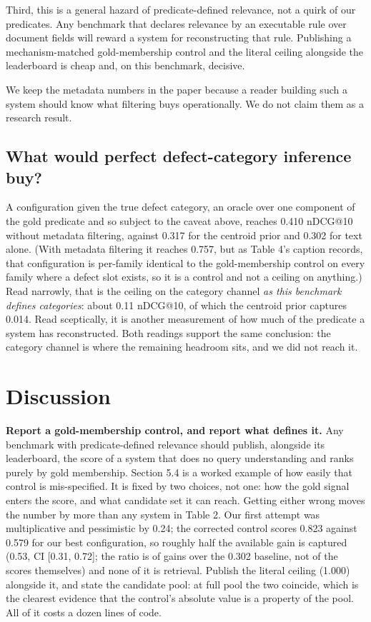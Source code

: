 \documentclass[runningheads]{llncs}
\begin{document}
Third, this is a general hazard of predicate-defined relevance, not a quirk of our predicates. Any benchmark that declares relevance by an executable rule over document fields will reward a system for reconstructing that rule. Publishing a mechanism-matched gold-membership control and the literal ceiling alongside the leaderboard is cheap and, on this benchmark, decisive.

We keep the metadata numbers in the paper because a reader building such a system should know what filtering buys operationally. We do not claim them as a research result.


\subsection{What would perfect defect-category inference buy?}
A configuration given the true defect category, an oracle over one component of the gold predicate and so subject to the caveat above, reaches 0.410 nDCG@10 without metadata filtering, against 0.317 for the centroid prior and 0.302 for text alone. (With metadata filtering it reaches 0.757, but as Table 4's caption records, that configuration is per-family identical to the gold-membership control on every family where a defect slot exists, so it is a control and not a ceiling on anything.) Read narrowly, that is the ceiling on the category channel \textit{as this benchmark defines categories}: about 0.11 nDCG@10, of which the centroid prior captures 0.014. Read sceptically, it is another measurement of how much of the predicate a system has reconstructed. Both readings support the same conclusion: the category channel is where the remaining headroom sits, and we did not reach it.


\section{Discussion}
\textbf{Report a gold-membership control, and report what defines it.} Any benchmark with predicate-defined relevance should publish, alongside its leaderboard, the score of a system that does no query understanding and ranks purely by gold membership. Section 5.4 is a worked example of how easily that control is mis-specified. It is fixed by two choices, not one: how the gold signal enters the score, and what candidate set it can reach. Getting either wrong moves the number by more than any system in Table 2. Our first attempt was multiplicative and pessimistic by 0.24; the corrected control scores 0.823 against 0.579 for our best configuration, so roughly half the available gain is captured (0.53, CI [0.31, 0.72]; the ratio is of gains over the 0.302 baseline, not of the scores themselves) and none of it is retrieval. Publish the literal ceiling (1.000) alongside it, and state the candidate pool: at full pool the two coincide, which is the clearest evidence that the control's absolute value is a property of the pool. All of it costs a dozen lines of code.
\end{document}
